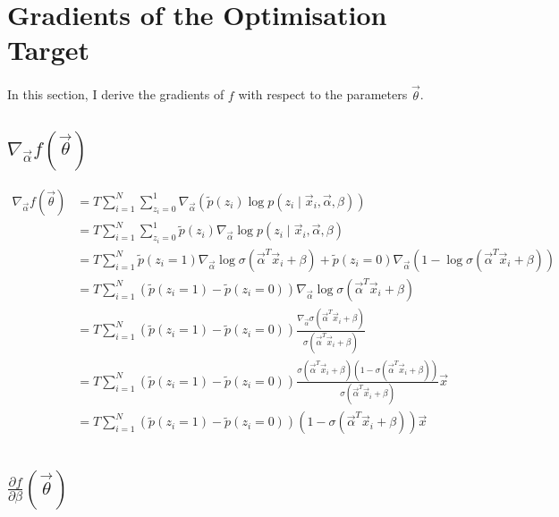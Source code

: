 \documentclass[a4paper]{article}
\begin{document}
    \section{Gradients of the Optimisation Target}

        In this section, I derive the gradients of $f$ with respect to the parameters $\vec \theta$.

        \subsection{$\nabla_{\vec \alpha} f(\vec \theta)$}

            \begin{align*}
                \nabla_{\vec \alpha} f(\vec \theta) &= T \sum_{i = 1}^N \sum_{z_i = 0}^1 \nabla_{\vec \alpha} (\tilde p(z_i) \log p(z_i \mid \vec x_i, \vec \alpha, \beta))\\
                    &= T \sum_{i = 1}^N \sum_{z_i = 0}^1 \tilde p(z_i) \nabla_{\vec \alpha} \log p(z_i \mid \vec x_i, \vec \alpha, \beta)\\
                    &= T \sum_{i = 1}^N \tilde p(z_i = 1) \nabla_{\vec \alpha} \log \sigma(\vec \alpha^T \vec x_i + \beta) + \tilde p(z_i = 0) \nabla_{\vec \alpha} (1 - \log \sigma(\vec \alpha^T \vec x_i + \beta))\\
                    &= T \sum_{i = 1}^N (\tilde p(z_i = 1) - \tilde p(z_i = 0)) \nabla_{\vec \alpha} \log \sigma(\vec \alpha^T \vec x_i + \beta)\\
                    &= T \sum_{i = 1}^N (\tilde p(z_i = 1) - \tilde p(z_i = 0)) \frac{\nabla_{\vec \alpha} \sigma(\vec \alpha^T \vec x_i + \beta)}{\sigma(\vec \alpha^T \vec x_i + \beta)}\\
                    &= T \sum_{i = 1}^N (\tilde p(z_i = 1) - \tilde p(z_i = 0)) \frac{\sigma(\vec \alpha^T \vec x_i + \beta)(1 - \sigma(\vec \alpha^T \vec x_i + \beta))}{\sigma(\vec \alpha^T \vec x_i + \beta)} \vec x\\
                    &= T \sum_{i = 1}^N (\tilde p(z_i = 1) - \tilde p(z_i = 0)) (1 - \sigma(\vec \alpha^T \vec x_i + \beta)) \vec x\\
            \end{align*}

        \subsection{$\frac{\partial f}{\partial \beta}(\vec \theta)$}
            
\end{document}

